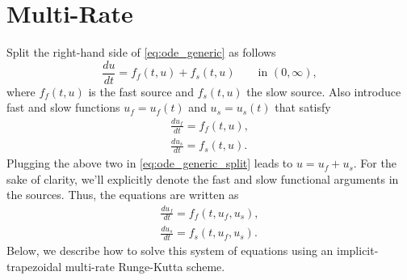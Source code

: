 \documentclass[oneside,a4paper,11pt]{report}
\begin{document}
\section{Multi-Rate}
Split the right-hand side of \cref{eq:ode_generic} as follows
\begin{equation}
    \label{eq:ode_generic_split}
    \frac{du}{dt} = f_f(t,u) + f_s(t,u) \qquad \text{in } (0,\infty),
\end{equation}
where $f_f(t,u)$ is the fast source and $f_s(t,u)$ the slow source. Also introduce fast and slow functions $u_f=u_f(t)$ and $u_s=u_s(t)$ that satisfy 
\begin{align}
    \frac{du_f}{dt} = f_f(t, u), \nonumber \\
    \frac{du_s}{dt}= f_s(t, u).
\end{align}
Plugging the above two in \cref{eq:ode_generic_split} leads to $u = u_f + u_s$. For the sake of clarity, we'll explicitly denote the fast and slow functional arguments in the sources. Thus, the equations are written as
\begin{align}
    \frac{du_f}{dt} = f_f(t,u_f, u_s), \nonumber \\
    \frac{du_s}{dt}= f_s(t,u_f,u_s).
\end{align}
Below, we describe how to solve this system of equations using an implicit-trapezoidal multi-rate Runge-Kutta scheme.
\end{document}
